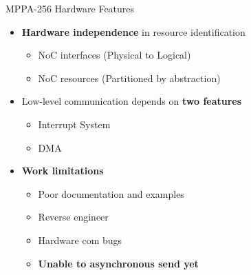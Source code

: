 		\begin{frame}[fragile]{MPPA-256 Hardware Features}
			\begin{itemize}
				\item \textbf{Hardware independence} in resource identification
				\begin{itemize}
					\item NoC interfaces (Physical to Logical)
					\item NoC resources (Partitioned by abstraction)
				\end{itemize}
			\end{itemize}

			\begin{itemize}
				\item Low-level communication depends on \textbf{two features}
				\begin{itemize}
					\item Interrupt System
					\item DMA
				\end{itemize}
			\end{itemize}

			\begin{itemize}
				\item \textbf{Work limitations}
				\begin{itemize}
					\item Poor documentation and examples
					\item Reverse engineer
					\item Hardware com bugs
					\item \textbf{Unable to asynchronous send yet}
				\end{itemize}
			\end{itemize}

		\end{frame}


